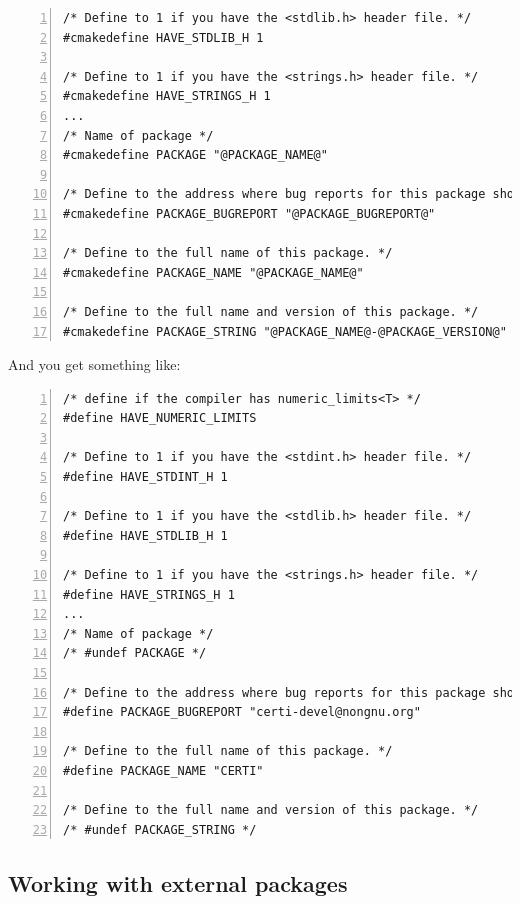 \documentclass[compress,slidestop,table,usepdftitle=false
              ]
               {beamer}
\newcommand{\fname}[1]{\texttt{#1}}
\begin{document}
\begin{frame}
\begin{Verbatim}[fontsize=\tiny,numbers=left,frame=topline,label=Excerpt from CERTI \fname{config.h.cmake}]
/* Define to 1 if you have the <stdlib.h> header file. */
#cmakedefine HAVE_STDLIB_H 1

/* Define to 1 if you have the <strings.h> header file. */
#cmakedefine HAVE_STRINGS_H 1
...
/* Name of package */
#cmakedefine PACKAGE "@PACKAGE_NAME@"

/* Define to the address where bug reports for this package should be sent. */
#cmakedefine PACKAGE_BUGREPORT "@PACKAGE_BUGREPORT@"

/* Define to the full name of this package. */
#cmakedefine PACKAGE_NAME "@PACKAGE_NAME@"

/* Define to the full name and version of this package. */
#cmakedefine PACKAGE_STRING "@PACKAGE_NAME@-@PACKAGE_VERSION@"
\end{Verbatim}

And you get something like:
\begin{Verbatim}[fontsize=\tiny,numbers=left,frame=topline,label=Excerpt from generated CERTI \fname{config.h}]
/* define if the compiler has numeric_limits<T> */
#define HAVE_NUMERIC_LIMITS

/* Define to 1 if you have the <stdint.h> header file. */
#define HAVE_STDINT_H 1

/* Define to 1 if you have the <stdlib.h> header file. */
#define HAVE_STDLIB_H 1

/* Define to 1 if you have the <strings.h> header file. */
#define HAVE_STRINGS_H 1
...
/* Name of package */
/* #undef PACKAGE */

/* Define to the address where bug reports for this package should be sent. */
#define PACKAGE_BUGREPORT "certi-devel@nongnu.org"

/* Define to the full name of this package. */
#define PACKAGE_NAME "CERTI"

/* Define to the full name and version of this package. */
/* #undef PACKAGE_STRING */
\end{Verbatim}
\end{frame}

\subsection{Working with external packages}
\end{document}
